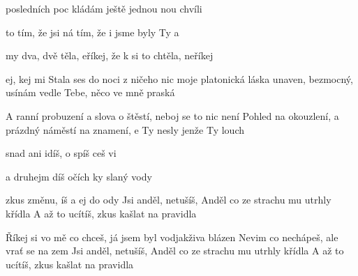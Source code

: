 
   

\zs
{} posledních poc
kládám ještě jednou nou chvíli

 to tím, že jsi 
ná tím, že i jsme byly Ty a 

my dva, dvě  těla,
eříkej, že k si to chtěla,
 neříkej

ej, kej mi 
\ks
\zs
Stala ses do noci
z ničeho nic moje platonická láska
unaven, bezmocný,
usínám vedle Tebe, něco ve mně praská

A ranní probuzení
a slova o štěstí, neboj se to nic není
Pohled na okouzlení,
a prázdný náměstí na znamení,
\ks
\zr
{}e Ty nesly
jenže Ty louch

snad ani idíš,
o spíš ceš vi

a druhejm díš
 očích ky slaný vody 

zkus změnu, íš 
a ej do ody
\kr
\zs
Jsi anděl, netušíš,
Anděl co ze strachu mu utrhly křídla
A až to ucítíš, zkus kašlat na pravidla



Říkej si vo mě co chceš,
já jsem byl vodjakživa blázen
Nevim co nechápeš,
ale vrať se na zem
\ks
\zr \kr
\zs
Jsi anděl, netušíš,
Anděl co ze strachu mu utrhly křídla
A až to ucítíš, zkus kašlat na pravidla
\ks
\zr \kr

\kp






